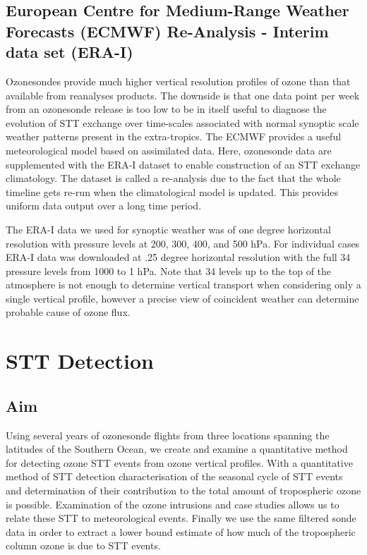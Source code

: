   \subsection{European Centre for Medium-Range Weather Forecasts (ECMWF) Re-Analysis - Interim data set (ERA-I)}
    Ozonesondes provide much higher vertical resolution profiles of ozone than that available from reanalyses products.
    The downside is that one data point per week from an ozonesonde release is too low to be in itself useful to diagnose the evolution of STT exchange over time-scales associated with normal synoptic scale weather patterns present in the extra-tropics.
    The ECMWF provides a useful meteorological model based on assimilated data.
    Here, ozonesonde data are supplemented with the ERA-I dataset \citep{Dee2011} to enable construction of an STT exchange climatology.
    The dataset is called a re-analysis due to the fact that the whole timeline gets re-run when the climatological model is updated.
    This provides uniform data output over a long time period.
    
    The ERA-I data we used for synoptic weather was of one degree horizontal resolution with pressure levels at 200, 300, 400, and 500 hPa.
    For individual cases ERA-I data was downloaded at .25 degree horizontal resolution with the full 34 pressure levels from 1000 to 1 hPa.
    Note that 34 levels up to the top of the atmosphere is not enough to determine vertical transport when considering only a single vertical profile, however a precise view of coincident weather can determine probable cause of ozone flux.
    

\section{STT Detection}

  \subsection{Aim}
    Using several years of ozonesonde flights from three locations spanning the latitudes of the Southern Ocean, we create and examine a quantitative method for detecting ozone STT events from ozone vertical profiles.
    With a quantitative method of STT detection characterisation of the seasonal cycle of STT events and determination of their contribution to the total amount of tropospheric ozone is possible.
    Examination of the ozone intrusions and case studies allows us to relate these STT to meteorological events.
    Finally we use the same filtered sonde data in order to extract a lower bound estimate of how much of the tropospheric column ozone is due to STT events.

